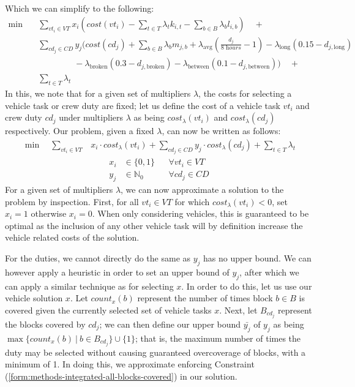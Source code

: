 \documentclass[]{article}
\begin{document}
Which we can simplify to the following:
\begin{align}
\min \quad & \sum_{vt_i \in VT} x_{i} (cost(vt_i) -\sum_{t \in T} \lambda_{t} k_{i,t} - \sum_{b \in B} \lambda_{b} l_{i,b})\quad+ \nonumber \\
& \sum_{cd_j \in CD} y_{j} (cost(cd_j) + \sum_{b \in B} \lambda_{b} m_{j,b} + \lambda_{\text{avg}} (\frac{d_{j}}{\textit{8 hours}} - 1) - \lambda_{\text{long}} (0.15 - d_{j,\text{long}}) \nonumber \\
&\quad\quad\quad\quad\:-\lambda_{\text{broken}} (0.3 - d_{j,\text{broken}}) - \lambda_{\text{between}} (0.1 - d_{j,\text{between}})) \quad + \nonumber \\
& \sum_{t \in T} \lambda_{t} \nonumber
\end{align}
In this, we note that for a given set of multipliers $\lambda$, the costs for selecting a vehicle task or crew duty are fixed; let us define the cost of a vehicle task $vt_i$ and crew duty $cd_j$ under multipliers $\lambda$ as being $cost_\lambda(vt_i)$ and $cost_\lambda(cd_j)$ respectively. Our problem, given a fixed $\lambda$, can now be written as follows:
\begin{align}
\min \quad \sum_{vt_i \in VT}& x_{i} \cdot cost_\lambda(vt_i) + \sum_{cd_j \in CD} y_{j} \cdot cost_\lambda(cd_j) + \sum_{t \in T} \lambda_{t}
\end{align}
\begin{align}
x_{i} &\in \{ 0, 1 \} && \forall vt_i \in VT \\
 y_{j} &\in \mathbb{N}_0 && \forall cd_j \in CD
\end{align}
For a given set of multipliers $\lambda$, we can now approximate a solution to the problem by inspection. First, for all $vt_i \in VT$ for which $cost_\lambda(vt_i) < 0$, set $x_i = 1$ otherwise $x_i = 0$. When only considering vehicles, this is guaranteed to be optimal as the inclusion of any other vehicle task will by definition increase the vehicle related costs of the solution. 

For the duties, we cannot directly do the same as $y_j$ has no upper bound. We can however apply a heuristic in order to set an upper bound of $y_j$, after which we can apply a similar technique as for selecting $x$. In order to do this, let us use our vehicle solution $x$. Let $\textit{count}_x(b)$ represent the number of times block $b \in B$ is covered given the currently selected set of vehicle tasks $x$. Next, let $B_{cd_j}$ represent the blocks covered by $cd_j$; we can then define our upper bound $\bar{y_{j}}$ of $y_j$ as being $\max \{ \textit{count}_x(b)\:|\:b \in B_{cd_j} \} \cup \{ 1 \}$; that is, the maximum number of times the duty may be selected without causing guaranteed overcoverage of blocks, with a minimum of 1. In doing this, we approximate enforcing Constraint (\ref{form:methods-integrated-all-blocks-covered}) in our solution.
\end{document}
